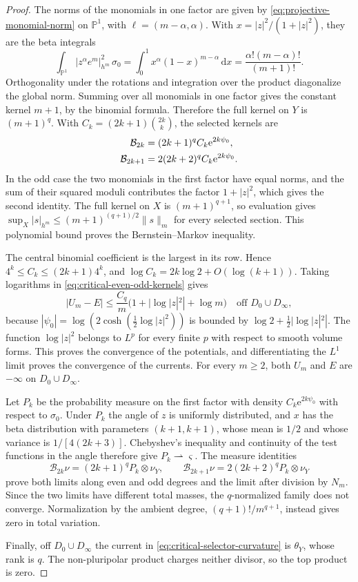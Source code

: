 \begin{proof}
The norms of the monomials in one factor are given by \eqref{eq:projective-monomial-norm} on $\mathbb P^1$, with
$\ell=(m-\alpha,\alpha)$. With $x=|z|^2/(1+|z|^2)$, they are the beta integrals
\begin{equation}\label{eq:fs-monomial-beta-norm}
 \int_{\mathbb P^1}|z^\alpha e^m|_{h^m}^2\,\sigma_0
 =\int_0^1x^\alpha(1-x)^{m-\alpha}\,\mathrm dx
 =\frac{\alpha!(m-\alpha)!}{(m+1)!}.
\end{equation}
Orthogonality under the rotations and integration over the product diagonalize the global
norm. Summing over all monomials in one factor gives the constant
kernel $m+1$, by the binomial formula. Therefore the full kernel on $Y$
is $(m+1)^q$. With $C_k=(2k+1)\binom{2k}{k}$, the selected
kernels are
\begin{align}
 \mathcal B_{2k}&=(2k+1)^q C_k\mathrm e^{2k\psi_0},\notag\\
 \mathcal B_{2k+1}&=2(2k+2)^q C_k\mathrm e^{2k\psi_0}.
 \label{eq:critical-even-odd-kernels}
\end{align}
In the odd case the two monomials in the first factor have equal norms, and the sum of their squared moduli contributes the factor $1+|z|^2$, which gives the second
identity. The full kernel on $X$ is $(m+1)^{q+1}$, so evaluation gives
$\sup_X|s|_{h^m}\leq(m+1)^{(q+1)/2}\|s\|_m$ for every selected
section. This polynomial bound proves the Bernstein--Markov inequality.

The central binomial coefficient is the largest in its row. Hence
$4^k\leq C_k\leq(2k+1)4^k$, and
$\log C_k=2k\log2+O(\log(k+1))$.
Taking logarithms in \eqref{eq:critical-even-odd-kernels} gives
\[
 |U_m-E|\leq\frac{C_q}{m}
       \bigl(1+|\log|z|^2|+\log m\bigr)
 \quad\text{off }D_0\cup D_\infty,
\]
because $|\psi_0|=\log(2\cosh(\tfrac12\log|z|^2))$ is bounded
by $\log2+\tfrac12|\log|z|^2|$. The function $\log|z|^2$ belongs to $L^p$ for every finite $p$ with respect to smooth volume forms. This proves the
convergence of the potentials, and differentiating the $L^1$ limit proves the
convergence of the currents. For every $m\geq2$, both $U_m$ and $E$ are $-\infty$ on $D_0\cup D_\infty$.

Let $P_k$ be the probability measure on the first factor with density
$C_k\mathrm e^{2k\psi_0}$ with respect to $\sigma_0$.
Under $P_k$ the angle of $z$ is uniformly distributed, and $x$ has the beta distribution with parameters
$(k+1,k+1)$, whose mean is $1/2$ and whose variance is
$1/[4(2k+3)]$. Chebyshev's inequality and continuity of the test functions in the angle therefore give $P_k\rightharpoonup\varsigma$.
The measure identities
\[
 \mathcal B_{2k}\nu=(2k+1)^q P_k\otimes\nu_Y,
 \qquad
 \mathcal B_{2k+1}\nu=2(2k+2)^q P_k\otimes\nu_Y
\]
prove both limits along even and odd degrees and the limit after division by
$N_m$. Since the two limits have different total masses, the
$q$-normalized family does not converge. Normalization by the ambient degree,
$(q+1)!/m^{q+1}$, instead gives zero in total variation.

Finally, off $D_0\cup D_\infty$ the current in
\eqref{eq:critical-selector-curvature} is $\theta_Y$, whose rank is $q$.
The non-pluripolar product charges neither divisor, so the top product
is zero.
\end{proof}

